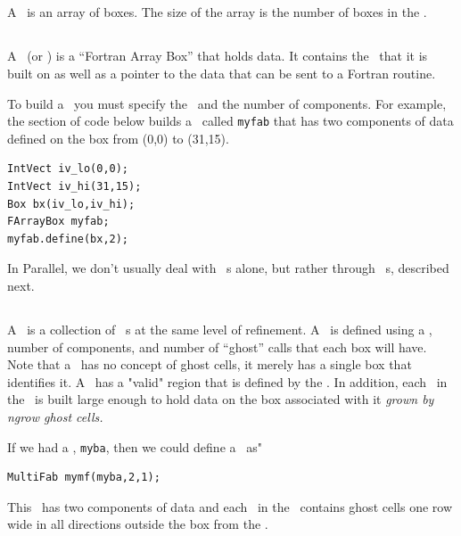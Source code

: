 \subsection{\BoxArray}

A \BoxArray\ is an array of boxes.   The size of the array is the 
number of boxes in the \BoxArray.

\subsection{\FArrayBox}

A \FArrayBox\ (or \Fab) is a ``Fortran Array Box'' that holds data.  It contains the
\BoxType\ that it is built on as well as a pointer to the data 
that can be sent to a Fortran routine.
 
To build a \Fab\ you must specify the \BoxType\ and the number of components.
For example, the section of code below builds a \Fab\ called {\tt myfab}
that has two components of data defined on the box from (0,0) to (31,15).

\begin{verbatim}
IntVect iv_lo(0,0);
IntVect iv_hi(31,15);
Box bx(iv_lo,iv_hi);
FArrayBox myfab;
myfab.define(bx,2);
\end{verbatim}

In Parallel, we don't usually deal with \Fab~s alone, but rather
through \MultiFab~s, described next.

\subsection{\MultiFab}

A \MultiFab\ is a collection of \Fab~s at the same level of
refinement.  A \MultiFab\ is defined using a \BoxArray,
number of components, and number of ``ghost'' calls that each box
will have.  Note that a \Fab\ has no concept of ghost cells, it
merely has a single box that identifies it.  A \MultiFab\ has
a "valid" region that is defined by the \BoxArray.  In addition,
each \Fab\ in the \MultiFab\ is built large enough to hold data
on the box associated with it {\it grown by ngrow ghost cells.}

If we had a \BoxArray, {\tt myba}, then we could define a \MultiFab\ as"

\begin{verbatim}
MultiFab mymf(myba,2,1);
\end{verbatim}

This \MultiFab\ has two components of data and each \Fab\ in the \MultiFab\ contains ghost cells one row wide in all directions outside the box from the \BoxArray.

